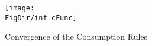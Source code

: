 \hypertarget{inf_cFunc}{}
\begin{figure}[tbp]
\centerline{\texttt{[image: \\FigDir/inf\_cFunc]}}
\caption{Convergence of the Consumption Rules}
\label{fig:inf_cFunc}
\end{figure}